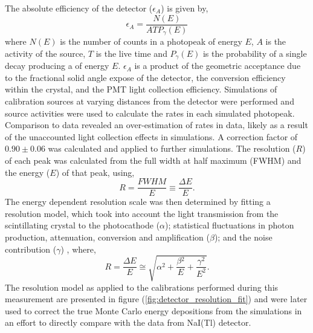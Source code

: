 The absolute efficiency of the detector ($\epsilon_{A}$) is given by,
%
\begin{equation}
    \epsilon_{A} = \frac{N(E)}{ATP_{\gamma}(E)}
    \label{eq:detector_eff}
\end{equation}
%
where $N(E)$ is the number of counts in a photopeak of energy $E$, $A$ is the activity of the source, $T$ is the live time and $P_{\gamma}(E)$ is the probability of a single decay producing a \gray{} of energy $E$. $\epsilon_{A}$ is a product of the geometric acceptance due to the fractional solid angle expose of the detector, the \gray{} conversion efficiency within the crystal, and the PMT light collection efficiency. Simulations of calibration sources at varying distances from the detector were performed and source activities were used to calculate the rates in each simulated photopeak. Comparison to data revealed an over-estimation of rates in data, likely as a result of the unaccounted light collection effects in simulations. A correction factor of $0.90 \pm 0.06$ was calculated and applied to further simulations. The resolution ($R$) of each peak was calculated from the full width at half maximum (FWHM) and the energy ($E$) of that peak, using,
%
\begin{equation}
    R = \frac{FWHM}{E} \equiv \frac{\Delta{}E}{E}.
    \label{eq:detector_eff}
\end{equation}
%
The energy dependent resolution scale was then determined by fitting a resolution model, which took into account the light transmission from the scintillating crystal to the photocathode ($\alpha$); statistical fluctuations in photon production, attenuation, conversion and amplification ($\beta$); and the noise contribution ($\gamma$) \cite{An:2016ses}, where,
%
\begin{equation}
    R = \frac{\Delta{}E}{E} \cong \sqrt{\alpha{}^2 + \frac{\beta{}^2}{E} + \frac{\gamma{}^2}{E^{2}}}.
    \label{eq:resolution_model}
\end{equation}
%
The resolution model as applied to the calibrations performed during this measurement are presented in figure (\ref{fig:detector_resolution_fit}) and were later used to correct the true Monte Carlo energy depositions from the simulations in an effort to directly compare with the data from NaI(Tl) detector.
%
